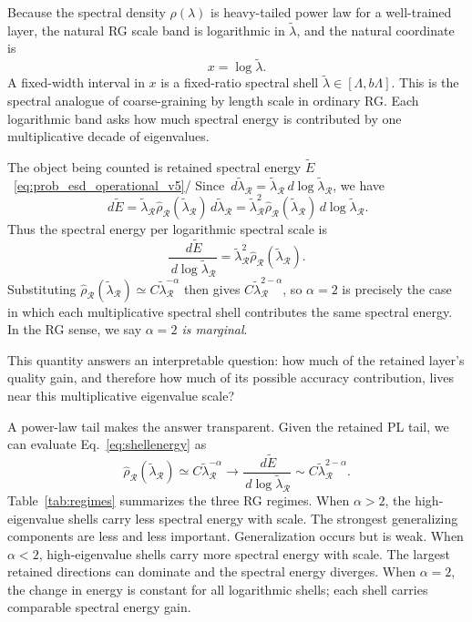 \documentclass[10pt,twocolumn]{article}
\newcommand{\dd}{\,d}
\newcommand{\Rell}{\mathcal R}
\newcommand{\rhohat}{\widehat\rho}
\newcommand{\Ered}{\widetilde{E}}
\begin{document}
Because the spectral density $\rho({\lambda})$ is heavy-tailed power law for a well-trained
layer, the natural RG scale band is logarithmic in $\tilde{\lambda}$, and the natural coordinate is
\begin{equation}
x=\log\tilde{\lambda}.
\end{equation}
A fixed-width interval in $x$ is a fixed-ratio spectral shell $\tilde{\lambda}\in[\Lambda,b\Lambda]$.
This is the spectral analogue of coarse-graining by length scale in ordinary
RG. Each logarithmic band asks how much spectral energy is contributed by one
multiplicative decade of eigenvalues.


The object being counted is retained spectral energy $\Ered$~\eqref{eq:prob_esd_operational_v5}/
Since $\dd\tilde{\lambda}_{\Rell}=\tilde{\lambda}_{\Rell}\dd\log\tilde{\lambda}_{\Rell}$, we have
\begin{equation}
\dd\Ered=\tilde{\lambda}_{\Rell}\rhohat_{\Rell}(\tilde{\lambda}_{\Rell})\dd\tilde{\lambda}_{\Rell}
=\tilde{\lambda}_{\Rell}^2\rhohat_{\Rell}(\tilde{\lambda}_{\Rell})\dd\log\tilde{\lambda}_{\Rell}.
\label{eq:shell_dE}
\end{equation}
Thus the spectral energy per logarithmic spectral scale is
\begin{equation}
\frac{\dd\Ered}{\dd\log\tilde{\lambda}_{\Rell}}=\tilde{\lambda}_{\Rell}^2\rhohat_{\Rell}(\tilde{\lambda}_{\Rell}).
\label{eq:shellenergy}
\end{equation}
Substituting $\rhohat_{\Rell}(\tilde{\lambda}_{\Rell})\simeq C\tilde{\lambda}_{\Rell}^{-\alpha}$ then gives $C\tilde{\lambda}_{\Rell}^{2-\alpha}$, so $\alpha=2$ is precisely the case in which each multiplicative spectral shell contributes the same spectral energy.
In the RG sense, we say \emph{$\alpha=2$ is marginal}.

This quantity answers an interpretable question: how much of the retained layer's quality gain, and therefore how much of its possible accuracy contribution, lives near this multiplicative eigenvalue scale?

A power-law tail makes the answer transparent. Given the retained PL tail, we can evaluate Eq.~\ref{eq:shellenergy} as
\begin{equation}
\rhohat_{\Rell}(\tilde{\lambda}_{\Rell})\simeq C\tilde{\lambda}_{\Rell}^{-\alpha}
\rightarrow
\frac{\dd\Ered}{\dd\log\tilde{\lambda}_{\Rell}}
\sim C\tilde{\lambda}_{\Rell}^{2-\alpha}.
\label{eq:shellpower}
\end{equation}
Table~\ref{tab:regimes} summarizes the three RG regimes.
When $\alpha>2$, the high-eigenvalue shells carry less spectral energy with scale.
The strongest generalizing components are less and less important.  Generalization occurs but is weak.
When $\alpha<2$, high-eigenvalue shells carry more spectral energy with scale. The largest retained directions can dominate and the spectral energy diverges.
When $\alpha=2$, the change in energy is constant for all logarithmic shells; each shell carries comparable spectral energy gain. 
\end{document}
